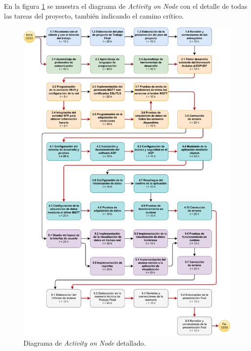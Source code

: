 \documentclass[
11pt, %
]{charter}
\begin{document}
En la figura \ref{fig:AoN} se muestra el diagrama de \textit{Activity on Node} con el detalle de todas las tareas del proyecto, también indicando el camino crítico.
\begin{figure}[htpb]
\centering 
\includegraphics[width=1\textwidth]{./Figuras/AON_Full.pdf}
\caption{Diagrama de \textit{Activity on Node} detallado.}
\label{fig:AoN}
\end{figure}
\end{document}
